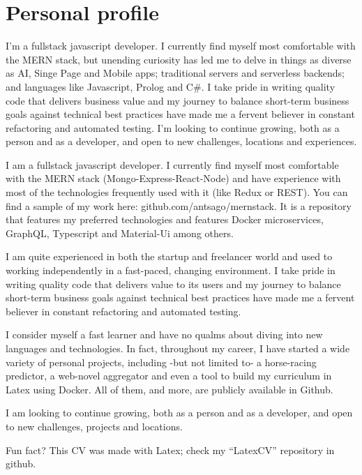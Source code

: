 \documentclass[10pt]{CurriculumVitae}
\begin{document}
  \makeheading


  \section{Personal profile}
    {
      I'm a fullstack javascript developer.
      I currently find myself most comfortable with the MERN stack,
      but unending curiosity has led me to delve in things as diverse as
      AI, Singe Page and Mobile apps;
      traditional servers and serverless backends;
      and languages like Javascript, Prolog and C\#.
      I take pride in writing quality code that delivers business value
      and my journey to balance short-term business goals against technical best practices
      have made me a fervent believer in constant refactoring and automated testing.
      I'm looking to continue growing, both as a person and as a developer,
      and open to new challenges, locations and experiences.

      I am a fullstack javascript developer. I currently find myself most comfortable with the MERN stack (Mongo-Express-React-Node) and have experience with most of the technologies frequently used with it (like Redux or REST). You can find a sample of my work here: github.com/antsago/mernstack. It is a repository that features my preferred technologies and features Docker microservices, GraphQL, Typescript and Material-Ui among others.

      I am quite experienced in both the startup and freelancer world and used to working independently in a fast-paced, changing environment. I take pride in writing quality code that delivers value to its users and my journey to balance short-term business goals against technical best practices have made me a fervent believer in constant refactoring and automated testing.

      I consider myself a fast learner and have no qualms about diving into new languages and technologies. In fact, throughout my career, I have started a wide variety of personal projects, including -but not limited to- a horse-racing predictor, a web-novel aggregator and even a tool to build my curriculum in Latex using Docker. All of them, and more, are publicly available in Github.

      I am looking to continue growing, both as a person and as a developer, and open to new challenges, projects and locations. 
      
      \null\hfill {\scriptsize Fun fact? This CV was made with Latex; check my ``LatexCV'' repository in github.}
    }
\end{document}
